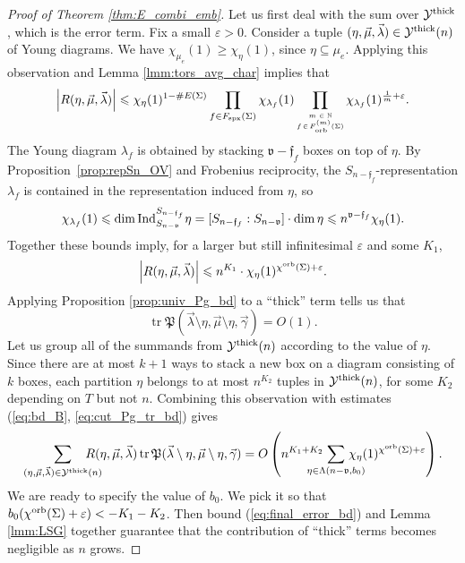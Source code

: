\documentclass{amsart}
\newcommand{\cho}{\chi^{\textnormal{orb}}}
\newcommand{\Fspx}{F_{\textnormal{spx}}}
\newcommand{\Forb}[1][m]{F^{(#1)}_{\textnormal{orb}}}
\newcommand{\iterorb}{{\tiny\begin{matrix}m\in\mathbb{N}\\f\!\in\!\Forb(\Sigma)\end{matrix}}}
\newcommand{\tn}{\textnormal}
\newcommand{\tr}{\operatorname{tr}}
\begin{document}
\begin{proof}[Proof of Theorem \ref{thm:E_combi_emb}]
Let us first deal with the sum over $\mathcal{Y}^\tn{thick}$, which is the error term. Fix a small $\varepsilon>0$. Consider a tuple $(\eta,\vec\mu,\vec\lambda)\in\mathcal{Y}^\tn{thick}(n)$ of Young diagrams. We have $\chi_{\mu_e}(1)\geqslant\chi_\eta(1)$, since $\eta\subseteq\mu_e$. Applying this observation and Lemma \ref{lmm:tors_avg_char} implies that
\begin{equation*}
\left|R(\eta,\vec\mu,\vec\lambda)\right|\leqslant\chi_\eta(1)^{1-\#E(\Sigma)}\prod_{f\in\Fspx(\Sigma)}\chi_{\lambda_f}(1)\prod_\iterorb\chi_{\lambda_f}(1)^{\frac{1}{m}+\varepsilon}.
\end{equation*}
The Young diagram $\lambda_f$ is obtained by stacking $\mathfrak{v}-\mathfrak{f}_f$ boxes on top of $\eta$. By Proposition~\ref{prop:repSn_OV} and Frobenius reciprocity, the $S_{n-\mathfrak{f}_f}$-representation $\lambda_f$ is contained in the representation induced from $\eta$, so
\begin{equation*}
\chi_{\lambda_f}(1)\leqslant\dim\tn{Ind}^{S_{n-\mathfrak{f}_f}}_{S_{n-\mathfrak{v}}}\eta=[S_{n-\mathfrak{f}_f}:S_{n-\mathfrak{v}}]\cdot\dim\eta\leqslant n^{\mathfrak{v}-\mathfrak{f}_f}\chi_\eta(1).
\end{equation*}
Together these bounds imply, for a larger but still infinitesimal $\varepsilon$ and some $K_1$,
\begin{equation}\label{eq:bd_B}
\left|R(\eta,\vec\mu,\vec\lambda)\right|\leqslant n^{K_1}\cdot\chi_\eta(1)^{\cho(\Sigma)+\varepsilon}.
\end{equation}
Applying Proposition \ref{prop:univ_Pg_bd} to a ``thick'' term tells us that
\begin{equation}\label{eq:cut_Pg_tr_bd}
\tr\mathfrak{P}(\vec\lambda\setminus\eta,\vec\mu\setminus\eta,\vec\gamma)=O(1).
\end{equation}
Let us group all of the summands from $\mathcal{Y}^\tn{thick}(n)$ according to the value of $\eta$. Since there are at most $k+1$ ways to stack a new box on a diagram consisting of $k$ boxes, each partition $\eta$ belongs to at most $n^{K_2}$ tuples in $\mathcal{Y}^\tn{thick}(n)$, for some $K_2$ depending on $T$ but not $n$. Combining this observation with estimates (\ref{eq:bd_B}, \ref{eq:cut_Pg_tr_bd}) gives
\begin{equation}\label{eq:final_error_bd}
\sum_{(\eta,\vec\mu,\vec\lambda)\in\mathcal{Y}^\tn{thick}(n)}\hspace*{-15pt}R(\eta,\vec\mu,\vec\lambda)\tr\mathfrak{P}(\vec\lambda\setminus\eta,\vec\mu\setminus\eta,\vec\gamma)=O\left(n^{K_1+K_2}\hspace*{-15pt}\sum_{\eta\in\Lambda(n-\mathfrak{v},b_0)}\hspace*{-15pt}\chi_\eta(1)^{\cho(\Sigma)+\varepsilon}\right).
\end{equation}
We are ready to specify the value of $b_0$. We pick it so that $b_0(\cho(\Sigma)+\varepsilon)<-K_1-K_2$. Then bound (\ref{eq:final_error_bd}) and Lemma \ref{lmm:LSG} together guarantee that the contribution of ``thick'' terms becomes negligible as $n$ grows.


\end{proof}
\end{document}
